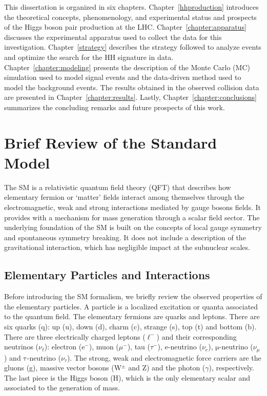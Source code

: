 This dissertation is organized in six chapters. Chapter~\ref{hhproduction} introduces the theoretical concepts, phenomenology, and experimental status and prospects of the Higgs boson pair production at the LHC. Chapter~\ref{chapter:apparatus} discusses the experimental apparatus used to collect the data for this investigation.  Chapter~\ref{strategy} describes the strategy followed to analyze events and optimize the search for the HH signature in data. Chapter~\ref{chapter:modeling} presents the description of the Monte Carlo (MC) simulation used to model signal events and the data-driven method used to model the background events. The results obtained in the observed collision data are presented in Chapter~\ref{chapter:results}. Lastly, Chapter~\ref{chapter:conclusions} summarizes the concluding remarks and future prospects of this work.

\section{Brief Review of the Standard Model}
The SM is a relativistic quantum field theory (QFT) that describes how elementary fermion or `matter' fields interact among themselves through the electromagnetic, weak and strong interactions mediated by gauge bosons fields.  It provides with a mechanism for mass generation through a scalar field sector. The underlying foundation of the SM is built on the concepts of local gauge symmetry and spontaneous symmetry breaking. It does not include a description of the gravitational interaction, which has negligible impact at the subnuclear scales.

\subsection{Elementary Particles and Interactions}

Before introducing the SM formalism, we briefly review the observed properties of the elementary particles. A particle is a localized excitation or quanta associated to the quantum field. The elementary fermions are quarks and leptons. There are six quarks (q): up (u), down (d), charm (c), strange (s), top (t) and bottom (b). There are three electrically charged leptons ($\ell^{-}$) and their corresponding neutrinos ($\nu_{\ell}$): electron (e$^{-}$), muon ($\mu^{-}$), tau ($\tau^{-}$), e-neutrino ($\nu_{e}$), $\mathrm{\mu}$-neutrino ($\nu_{\mu}$) and $\mathrm{\tau}$-neutrino ($\nu_{\tau}$). The strong, weak and electromagnetic force carriers are the gluons (g), massive vector bosons (W$^{\pm}$ and Z) and the photon ($\gamma$), respectively. The last piece is the Higgs boson (H), which is the only elementary scalar and associated to the generation of mass.

